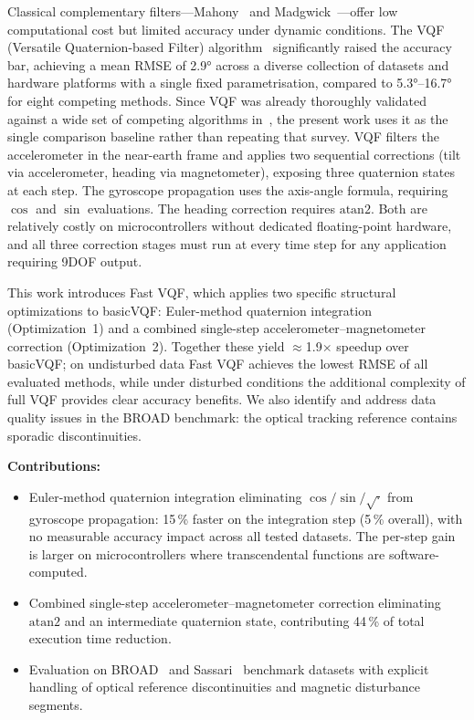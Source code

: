 \documentclass[conference]{IEEEtran}
\begin{document}
Classical complementary filters—Mahony~\cite{mahony2008} and Madgwick~\cite{madgwick2010}—offer low computational cost but limited accuracy under dynamic conditions. The VQF (Versatile Quaternion-based Filter) algorithm~\cite{laidig2023vqf} significantly raised the accuracy bar, achieving a mean RMSE of 2.9° across a diverse collection of datasets and hardware platforms with a single fixed parametrisation, compared to 5.3°–16.7° for eight competing methods. Since VQF was already thoroughly validated against a wide set of competing algorithms in~\cite{laidig2023vqf}, the present work uses it as the single comparison baseline rather than repeating that survey. VQF filters the accelerometer in the near-earth frame and applies two sequential corrections (tilt via accelerometer, heading via magnetometer), exposing three quaternion states at each step. The gyroscope propagation uses the axis-angle formula, requiring $\cos$ and $\sin$ evaluations. The heading correction requires $\mathrm{atan2}$. Both are relatively costly on microcontrollers without dedicated floating-point hardware, and all three correction stages must run at every time step for any application requiring 9DOF output.

This work introduces Fast VQF, which applies two specific structural optimizations to basicVQF: Euler-method quaternion integration (Optimization~1) and a combined single-step accelerometer--magnetometer correction (Optimization~2). Together these yield $\approx$1.9$\times$ speedup over basicVQF; on undisturbed data Fast VQF achieves the lowest RMSE of all evaluated methods, while under disturbed conditions the additional complexity of full VQF provides clear accuracy benefits. We also identify and address data quality issues in the BROAD benchmark: the optical tracking reference contains sporadic discontinuities.

\textbf{Contributions:}
\begin{itemize}
    \item Euler-method quaternion integration eliminating $\cos/\sin/\sqrt{\cdot}$ from gyroscope propagation: 15\,\% faster on the integration step (5\,\% overall), with no measurable accuracy impact across all tested datasets. The per-step gain is larger on microcontrollers where transcendental functions are software-computed.
    \item Combined single-step accelerometer--magnetometer correction eliminating $\mathrm{atan2}$ and an intermediate quaternion state, contributing 44\,\% of total execution time reduction.
    \item Evaluation on BROAD~\cite{laidig2021broad} and Sassari~\cite{caruso2021sassari} benchmark datasets with explicit handling of optical reference discontinuities and magnetic disturbance segments.
\end{itemize}
\end{document}
